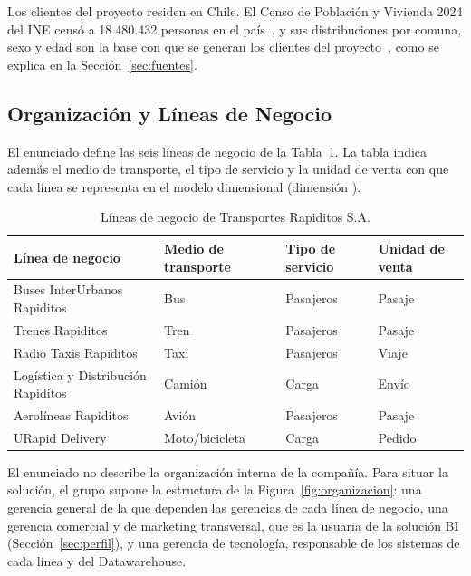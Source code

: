 Los clientes del proyecto residen en Chile. El Censo de Población y Vivienda
2024 del INE censó a 18.480.432 personas en el país~\cite{ine_censo_resultados}, y sus
distribuciones por comuna, sexo y edad son la base con que se generan los
clientes del proyecto~\cite{ine_censo2024}, como se explica en la
Sección~\ref{sec:fuentes}.

\subsection{Organización y Líneas de Negocio}

El enunciado define las seis líneas de negocio de la
Tabla~\ref{tab:lineas_negocio}. La tabla indica además el medio de transporte,
el tipo de servicio y la unidad de venta con que cada línea se representa en el
modelo dimensional (dimensión ).

\begin{table}[!htbp]
  \centering
  \caption{Líneas de negocio de Transportes Rapiditos S.A.}
  \label{tab:lineas_negocio}
  \small
  \begin{tabularx}{\linewidth}{@{}>{\raggedright\arraybackslash}Xlll@{}}
    \toprule
    \textbf{Línea de negocio} & \textbf{Medio de transporte}
      & \textbf{Tipo de servicio} & \textbf{Unidad de venta} \\
    \midrule
    Buses InterUrbanos Rapiditos       & Bus            & Pasajeros & Pasaje \\
    Trenes Rapiditos                   & Tren           & Pasajeros & Pasaje \\
    Radio Taxis Rapiditos              & Taxi           & Pasajeros & Viaje \\
    Logística y Distribución Rapiditos & Camión         & Carga     & Envío \\
    Aerolíneas Rapiditos               & Avión          & Pasajeros & Pasaje \\
    URapid Delivery                    & Moto/bicicleta & Carga     & Pedido \\
    \bottomrule
  \end{tabularx}
\end{table}

El enunciado no describe la organización interna de la compañía. Para
situar la solución, el grupo supone la estructura de la
Figura~\ref{fig:organizacion}: una gerencia general de la que dependen las
gerencias de cada línea de negocio, una gerencia comercial y de marketing
transversal, que es la usuaria de la solución BI (Sección~\ref{sec:perfil}), y
una gerencia de tecnología, responsable de los sistemas de cada línea y del
Datawarehouse.

